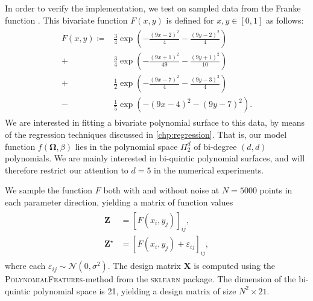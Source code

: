 \documentclass[dvipsnames, article, a4paper, oneside, 12pt]{memoir}
\newcommand{\mat}[1]{\bm{#1}}
\newcommand{\data}{\bm{\Omega}}
\newcommand{\N}{\mathcal{N}}
\begin{document}
  In order to verify the implementation, we test on sampled data from the
  Franke function \cite{frankeCriticalComparisonMethods1979}. This bivariate
  function \(F(x, y) \) is defined for \( x, y \in [0, 1] \) as follows:
  \begin{align}
    \begin{split}
      F(x,y) \coloneqq &\frac{3}{4} \exp\left( -\frac{(9x - 2)^2}{4} - \frac{(9y - 2)^2}{4}\right) \\
      + &\frac{3}{4}\exp\left( -\frac{(9x + 1)^2}{49} - \frac{(9 y + 1)^2}{10}\right) \\
      + &\frac{1}{2}\exp\left(-\frac{(9x-7)^2}{4} - \frac{(9y-3)^2}{4}\right) \\
      - &\frac{1}{5}\exp\left(-(9x - 4)^2 - (9y - 7)^2\right).
    \end{split} 
  \end{align}
  We are interested in fitting a bivariate polynomial surface to this data, by
  means of the regression techniques discussed in \cref{chp:regression}. That
  is, our model function \( f(\data, \beta) \) lies in the polynomial space \(
  \Pi_{2}^d \) of bi-degree \( (d, d) \) polynomials. We are mainly interested
  in bi-quintic polynomial surfaces, and will therefore restrict our attention
  to \( d = 5 \) in the numerical experiments.
  
  We sample the function \( F \) both with and without noise at \( N = 5000 \) points in each
  parameter direction, yielding a matrix of function values
  \begin{align}
    \begin{split}
      \mat{Z} &= \left[F(x_i, y_j) \right]_{ij}, \\
      \mat{Z}^\star &= \left[F(x_i, y_j) + \varepsilon_{ij}\right]_{ij},
    \end{split}
  \end{align}
  where each \( \varepsilon_{ij} \sim \N(0, \sigma^2) \). The design matrix \(
  \mat{X} \) is computed using the \textsc{PolynomialFeatures}-method from the
  \textsc{sklearn} package. The dimension of the bi-quintic polynomial space is
  21, yielding a design matrix of size \( N^2 \times 21 \).
\end{document}
